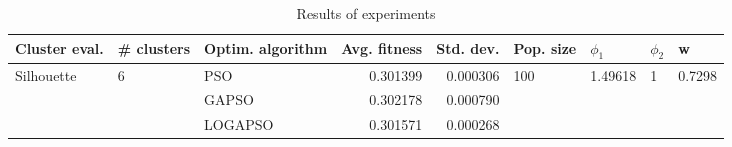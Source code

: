 \begin{table}
\centering
\caption{Results of experiments}
\begin{tabular}{lllrrllll}
\toprule
              Cluster eval. &        \# clusters & Optim. algorithm &  Avg. fitness &  Std. dev. &            Pop. size &               $\phi_{1}$ &         $\phi_{2}$ &                       w \\
\midrule
\multirow{3}{*}{Silhouette} & \multirow{3}{*}{6} &              PSO &      0.301399 &   0.000306 & \multirow{3}{*}{100} & \multirow{3}{*}{1.49618} & \multirow{3}{*}{1} & \multirow{3}{*}{0.7298} \\
                            &                    &            GAPSO &      0.302178 &   0.000790 &                      &                          &                    &                         \\
                            &                    &          LOGAPSO &      0.301571 &   0.000268 &                      &                          &                    &                         \\
\bottomrule
\end{tabular}
\end{table}
